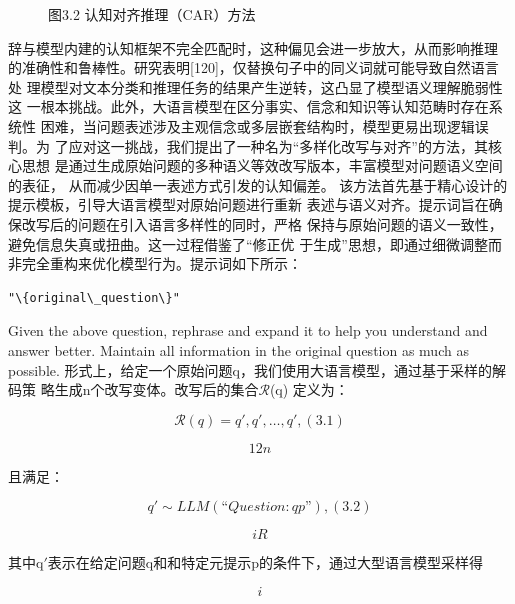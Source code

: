 \documentclass[12pt,a4paper,openright,UTF8]{ctexbook}
\begin{document}
\begin{figure}[htbp]
\centering
{}
\caption{图3.2 认知对齐推理（CAR）方法}
\end{figure}

辞与模型内建的认知框架不完全匹配时，这种偏见会进一步放大，从而影响推理 的准确性和鲁棒性。研究表明[120]，仅替换句子中的同义词就可能导致自然语言处 理模型对文本分类和推理任务的结果产生逆转，这凸显了模型语义理解脆弱性这 一根本挑战。此外，大语言模型在区分事实、信念和知识等认知范畴时存在系统性 困难，当问题表述涉及主观信念或多层嵌套结构时，模型更易出现逻辑误判。为 了应对这一挑战，我们提出了一种名为“多样化改写与对齐”的方法，其核心思想 是通过生成原始问题的多种语义等效改写版本，丰富模型对问题语义空间的表征， 从而减少因单一表述方式引发的认知偏差。 该方法首先基于精心设计的提示模板，引导大语言模型对原始问题进行重新 表述与语义对齐。提示词旨在确保改写后的问题在引入语言多样性的同时，严格 保持与原始问题的语义一致性，避免信息失真或扭曲。这一过程借鉴了“修正优 于生成”思想，即通过细微调整而非完全重构来优化模型行为。提示词如下所示：

\begin{lstlisting}
"\{original\_question\}"
\end{lstlisting}
Given the above question, rephrase and expand it to help you understand and answer better. Maintain all information in the original question as much as possible. 形式上，给定一个原始问题q，我们使用大语言模型，通过基于采样的解码策 略生成n个改写变体。改写后的集合$\mathcal{R}$(q) 定义为：

\begin{equation*}
\mathcal{R}(q) = {q', q', \ldots , q'},(3.1)
\end{equation*}

\begin{equation*}
12n
\end{equation*}

且满足：

\begin{equation*}
q'\sim LLM(“Question: {q} {p}”),(3.2)
\end{equation*}

\begin{equation*}
iR
\end{equation*}

其中q$'$表示在给定问题q和和特定元提示p的条件下，通过大型语言模型采样得

\begin{equation*}
i
\end{equation*}
\end{document}
